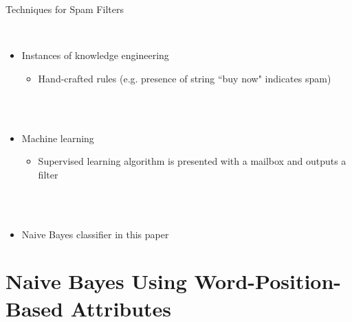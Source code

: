 \documentclass[]{beamer}
\begin{document}
\begin{frame}[t]{\centerline{Techniques for Spam Filters}}
  \ \\
  \fontsize{14}{12}\selectfont
  \begin{itemize}
  \item Instances of knowledge engineering
  \begin{itemize}
  \item Hand-crafted rules (e.g. presence of string ``buy now" indicates spam)
  \end{itemize}
  \ \\
  \ \\
\pause
  \item Machine learning
  \begin{itemize}
  \item Supervised learning algorithm is presented with a mailbox and outputs a filter
  \end{itemize}
  \ \\
  \ \\
\pause
  \item Naive Bayes classifier in this paper
  \end{itemize}
\end{frame}
\note{}

\section{Naive Bayes Using Word-Position-Based Attributes}
\end{document}

